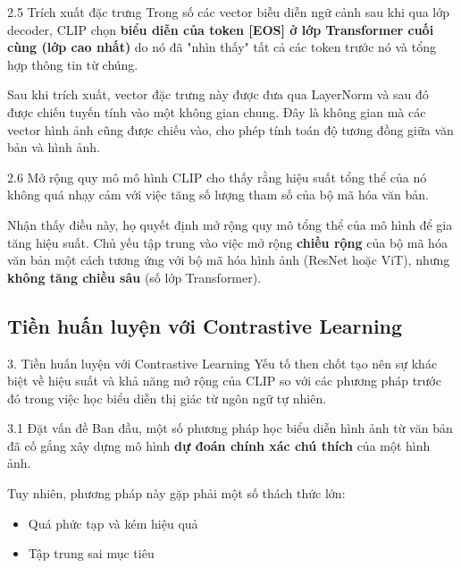 \begin{frame}{2.5 Trích xuất đặc trưng}
    Trong số các vector biễu diễn ngữ cảnh sau khi qua lớp decoder, CLIP chọn \textbf{biểu diễn của token [EOS] ở lớp Transformer cuối cùng (lớp cao nhất)} do nó đã "nhìn thấy" tất cả các token trước nó và tổng hợp thông tin từ chúng.

    \bigskip
    Sau khi trích xuất, vector đặc trưng này được đưa qua LayerNorm và sau đó được chiếu tuyến tính vào một không gian chung. Đây là không gian mà các vector hình ảnh cũng được chiếu vào, cho phép tính toán độ tương đồng giữa văn bản và hình ảnh.    
\end{frame}

\begin{frame}{2.6 Mở rộng quy mô mô hình}
    CLIP cho thấy rằng hiệu suất tổng thể của nó không quá nhạy cảm với việc tăng số lượng tham số của bộ mã hóa văn bản.

    \bigskip
    Nhận thấy điều này, họ quyết định mở rộng quy mô tổng thể của mô hình để gia tăng hiệu suất. Chủ yếu tập trung vào việc mở rộng \textbf{chiều rộng} của bộ mã hóa văn bản một cách tương ứng với bộ mã hóa hình ảnh (ResNet hoặc ViT), nhưng \textbf{không tăng chiều sâu} (số lớp Transformer).
\end{frame}

\subsection{Tiền huấn luyện với Contrastive Learning}
\begin{frame}{3. Tiền huấn luyện với Contrastive Learning}
    Yếu tố then chốt tạo nên sự khác biệt về hiệu suất và khả năng mở rộng của CLIP so với các phương pháp trước đó trong việc học biểu diễn thị giác từ ngôn ngữ tự nhiên.
\end{frame}

\begin{frame}{3.1 Đặt vấn đề}
    Ban đầu, một số phương pháp học biểu diễn hình ảnh từ văn bản đã cố gắng xây dựng mô hình \textbf{dự đoán chính xác chú thích} của một hình ảnh.
    \bigskip
    
    Tuy nhiên, phương pháp này gặp phải một số thách thức lớn:
    \begin{itemize}
        \item Quá phức tạp và kém hiệu quả
        \item Tập trung sai mục tiêu
    \end{itemize}
\end{frame}

